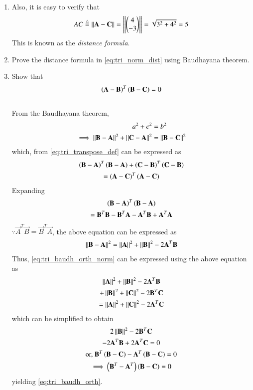 \begin{enumerate}[label=\arabic*.,ref=\thesubsection.\theenumi]
\item Also, it is easy to verify that
%
\begin{align}
\label{eq:tri_norm_dist}
AC \stackrel{\triangle}{=}  \left\lVert\mathbf{A}-\mathbf{C}\right\rVert =  \left\lVert\begin{pmatrix}4\\-3\end{pmatrix}\right\rVert = \sqrt{3^2+4^2} = 5
\end{align}
%
This is known as the {\em distance formula}.
%
\item Prove the distance formula in \eqref{eq:tri_norm_dist} using Baudhayana theorem.
%
\item Show that 
\begin{align}
\label{eq:tri_baudh_orth}
\left(\mathbf{A}-\mathbf{B}\right)^T\left(\mathbf{B}-\mathbf{C}\right) = 0
\end{align}
\\
\solution From the Baudhayana theorem,
\begin{align}
a^2+c^2 &= b^2
\\
\implies \left\lVert\mathbf{B}-\mathbf{A}\right\rVert^2+\left\lVert\mathbf{C}-\mathbf{A}\right\rVert^2&=\left\lVert\mathbf{B}-\mathbf{C}\right\rVert^2
\label{eq:tri_baudh_orth_norm}
\end{align}
which, from \eqref{eq:tri_transpose_def}
 can be expressed as
\begin{multline}
\left(\mathbf{B}-\mathbf{A}\right)^T\left(\mathbf{B}-\mathbf{A}\right)
+
\left(\mathbf{C}-\mathbf{B}\right)^T\left(\mathbf{C}-\mathbf{B}\right)
\\
=
\left(\mathbf{A}-\mathbf{C}\right)^T\left(\mathbf{A}-\mathbf{C}\right)
\end{multline}
%
Expanding
\begin{multline}
\left(\mathbf{B}-\mathbf{A}\right)^T\left(\mathbf{B}-\mathbf{A}\right) 
\\
= \mathbf{B}^T\mathbf{B} - \mathbf{B}^T\mathbf{A} - \mathbf{A}^T\mathbf{B}+\mathbf{A}^T\mathbf{A}
\end{multline}
$\because \vec{A}^T\vec{B} = \vec{B}^T\vec{A}$, the above equation can be expressed as
\begin{align}
\left\lVert\mathbf{B}-\mathbf{A}\right\rVert^2 = 
\left\lVert\mathbf{A}\right\rVert^2 + \left\lVert\mathbf{B}\right\rVert^2 - 2\mathbf{A}^T\mathbf{B}
\end{align}
%
Thus, \eqref{eq:tri_baudh_orth_norm} can be expressed using the above equation as
\begin{multline}
\left\lVert\mathbf{A}\right\rVert^2 + \left\lVert\mathbf{B}\right\rVert^2 - 2\mathbf{A}^T\mathbf{B}
\\
+
\left\lVert\mathbf{B}\right\rVert^2 + \left\lVert\mathbf{C}\right\rVert^2 - 2\mathbf{B}^T\mathbf{C}
\\
=
\left\lVert\mathbf{A}\right\rVert^2 + \left\lVert\mathbf{C}\right\rVert^2 - 2\mathbf{A}^T\mathbf{C}
\end{multline}
%
which can be simplified to obtain
%
\begin{multline}
2\left\lVert\mathbf{B}\right\rVert^2 - 2\mathbf{B}^T\mathbf{C}
\\
- 2\mathbf{A}^T\mathbf{B}+ 2\mathbf{A}^T\mathbf{C}
=0
\\
\text{or, } \mathbf{B}^T\left(\mathbf{B}-\mathbf{C}\right)
-\mathbf{A}^T\left(\mathbf{B}-\mathbf{C}\right) = 0
\\
\implies \left(\mathbf{B}^T-\mathbf{A}^T\right)\left(\mathbf{B}-\mathbf{C}\right) = 0
\end{multline}
yielding \eqref{eq:tri_baudh_orth}.

\end{enumerate}
